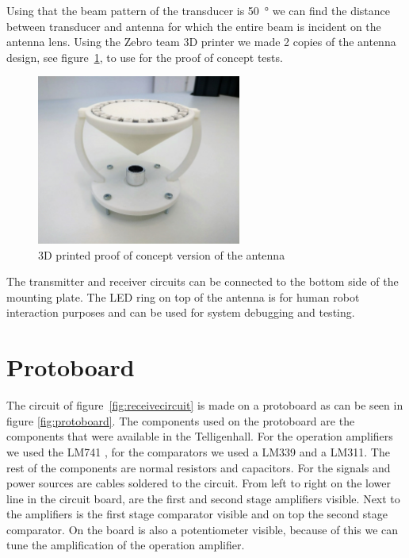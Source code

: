 Using that the beam pattern of the transducer is \SI{50}{\degree} we can find the distance between transducer and antenna for which the entire beam is incident on the antenna lens. Using the Zebro team 3D printer we made 2 copies of the antenna design, see figure~\ref{fig:3D_ant}, to use for the proof of concept tests.

\begin{figure}[H]
\centering
\includegraphics[width=0.6\textwidth]{Figures/3D_ant.jpeg}
\caption{3D printed proof of concept version of the antenna}\label{fig:3D_ant}
\end{figure}

The transmitter and receiver circuits can be connected to the bottom side of the mounting plate. The LED ring on top of the antenna is for human robot interaction purposes and can be used for system debugging and testing.


\section{Protoboard}

The circuit of figure~\ref{fig:receivecircuit} is made on a protoboard as can be seen in figure \ref{fig:protoboard}. The components used on the protoboard are the components that were available in the Telligenhall. For the operation amplifiers we used the LM741 \cite{LM741}
, for the comparators we used a LM339 and  a LM311. The rest of the components are normal resistors and capacitors. For the signals and power sources are cables soldered to the circuit. From left to right on the lower line in the circuit board, are the first and second stage amplifiers visible. Next to the amplifiers is the first stage comparator visible and on top the second stage comparator. On the board is also a potentiometer visible, because of this we can tune the amplification of the operation amplifier.


